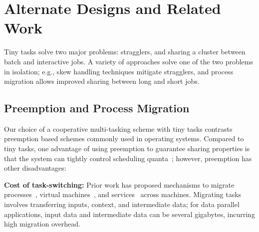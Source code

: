 \section{Alternate Designs and Related Work}
\label{sec:alternate}

Tiny tasks solve two major problems: stragglers, and sharing
a cluster between batch and interactive jobs. A variety of
approaches solve one of the two problems in isolation; e.g., skew handling
techniques mitigate stragglers, and process migration allows improved
sharing between long and short jobs.

\subsection{Preemption and Process Migration}
\label{sec:preemption}

Our choice of a cooperative multi-tasking scheme with tiny tasks 
contrasts preemption based schemes commonly used 
in operating systems.
Compared to tiny tasks, one advantage of using preemption to guarantee sharing
properties is that the system
can tightly control scheduling quanta~\cite{sherman1972trace,tanenbaum1990experiences};
however, preemption has other disadvantages:

\vspace{4pt}\noindent\textbf{Cost of task-switching:}
Prior work has proposed mechanisms to migrate
processes~\cite{douglis1991transparent,milojivcic2000process}, virtual
machines~\cite{clark2005live}, and services~\cite{rozier1991overview} across
machines.
Migrating tasks involves transferring inputs, context, and intermediate
data; for data parallel applications, input data and intermediate
data can be several gigabytes, incurring high migration overhead.


